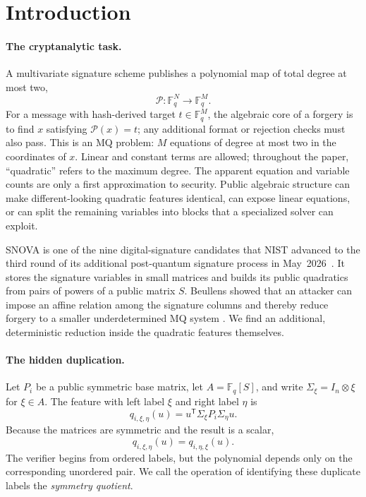 \documentclass[11pt]{article}
\newcommand{\F}{\mathbb F}
\newcommand{\transpose}{\mathsf T}
\newcommand{\SNOVA}{\textsf{SNOVA}}
\begin{document}
\section{Introduction}\label{sec:intro}

\paragraph{The cryptanalytic task.}
A multivariate signature scheme publishes a polynomial map of total degree
at most two,
\[
  \mathcal P:\F_q^{N}\longrightarrow\F_q^{M}.
\]
For a message with hash-derived target $t\in\F_q^M$, the algebraic core of a
forgery is to find $x$ satisfying $\mathcal P(x)=t$; any additional format or
rejection checks must also pass.  This is an MQ problem: $M$ equations of
degree at most two in the coordinates of $x$.  Linear and constant terms are
allowed; throughout the paper, ``quadratic'' refers to the maximum degree.
The apparent equation and variable counts are only a first approximation to
security.  Public algebraic structure can make different-looking quadratic
features identical, can expose linear equations, or can split the remaining
variables into blocks that a specialized solver can exploit.

\SNOVA{} is one of the nine digital-signature candidates that NIST advanced to
the third round of its additional post-quantum signature process in
May~2026~\cite{NISTThirdRound2026}.  It stores the signature variables in small
matrices and builds its public quadratics from pairs of powers of a public
matrix $S$.  Beullens showed
that an attacker can impose an affine relation among the signature columns and
thereby reduce forgery to a smaller underdetermined MQ system
\cite{Beullens2024SNOVA}.  We find an additional, deterministic reduction
inside the quadratic features themselves.

\paragraph{The hidden duplication.}
Let $P_i$ be a public symmetric base matrix, let
$A=\F_q[S]$, and write $\Sigma_\xi=I_n\otimes\xi$ for $\xi\in A$.  The feature
with left label $\xi$ and right label $\eta$ is
\[
  q_{i,\xi,\eta}(u)
  =u^\transpose\Sigma_\xi P_i\Sigma_\eta u.
\]
Because the matrices are symmetric and the result is a scalar,
\begin{equation}\label{eq:intro-swap}
  q_{i,\xi,\eta}(u)=q_{i,\eta,\xi}(u).
\end{equation}
The verifier begins from ordered labels, but the polynomial depends only on
the corresponding unordered pair.  We call the operation of identifying
these duplicate labels the \emph{symmetry quotient}.
\end{document}

